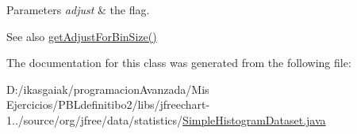 \begin{DoxyParams}{Parameters}
{\em adjust} & the flag.\\
\hline
\end{DoxyParams}
\begin{DoxySeeAlso}{See also}
\mbox{\hyperlink{classorg_1_1jfree_1_1data_1_1statistics_1_1_simple_histogram_dataset_a09695f11377643bfcc614305251d5d03}{get\+Adjust\+For\+Bin\+Size()}} 
\end{DoxySeeAlso}


The documentation for this class was generated from the following file\+:\begin{DoxyCompactItemize}
\item 
D\+:/ikasgaiak/programacion\+Avanzada/\+Mis Ejercicios/\+P\+B\+Ldefinitibo2/libs/jfreechart-\/1../source/org/jfree/data/statistics/\mbox{\hyperlink{_simple_histogram_dataset_8java}{Simple\+Histogram\+Dataset.\+java}}\end{DoxyCompactItemize}
